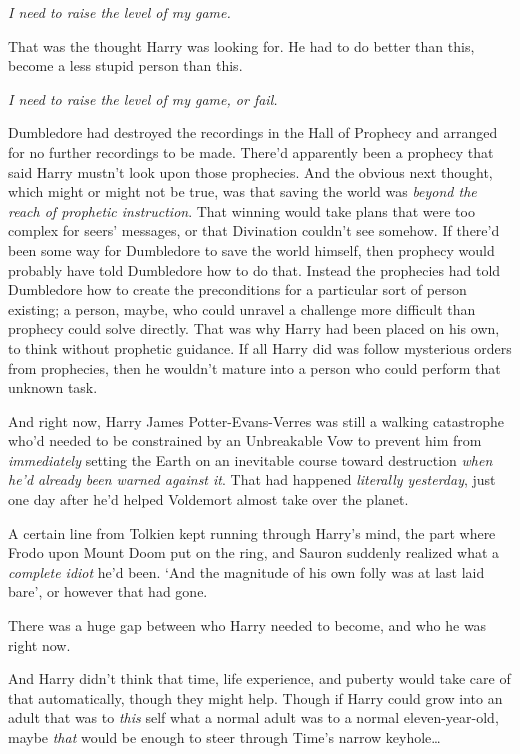 \emph{I need to raise the level of my game.}

That was the thought Harry was looking for. He had to do better than this, become a less stupid person than this.

\emph{I need to raise the level of my game, or fail.}

Dumbledore had destroyed the recordings in the Hall of Prophecy and arranged for no further recordings to be made. There’d apparently been a prophecy that said Harry mustn’t look upon those prophecies. And the obvious next thought, which might or might not be true, was that saving the world was \emph{beyond the reach of prophetic instruction}. That winning would take plans that were too complex for seers’ messages, or that Divination couldn’t see somehow. If there’d been some way for Dumbledore to save the world himself, then prophecy would probably have told Dumbledore how to do that. Instead the prophecies had told Dumbledore how to create the preconditions for a particular sort of person existing; a person, maybe, who could unravel a challenge more difficult than prophecy could solve directly. That was why Harry had been placed on his own, to think without prophetic guidance. If all Harry did was follow mysterious orders from prophecies, then he wouldn’t mature into a person who could perform that unknown task.

And right now, Harry James Potter-Evans-Verres was still a walking catastrophe who’d needed to be constrained by an Unbreakable Vow to prevent him from \emph{immediately} setting the Earth on an inevitable course toward destruction \emph{when he’d already been warned against it}. That had happened \emph{literally yesterday}, just one day after he’d helped Voldemort almost take over the planet.

A certain line from Tolkien kept running through Harry’s mind, the part where Frodo upon Mount Doom put on the ring, and Sauron suddenly realized what a \emph{complete idiot} he’d been. ‘And the magnitude of his own folly was at last laid bare’, or however that had gone.

There was a huge gap between who Harry needed to become, and who he was right now.

And Harry didn’t think that time, life experience, and puberty would take care of that automatically, though they might help. Though if Harry could grow into an adult that was to \emph{this} self what a normal adult was to a normal eleven-year-old, maybe \emph{that} would be enough to steer through Time’s narrow keyhole…

